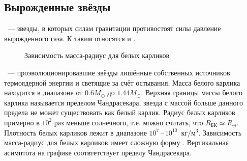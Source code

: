 \subsection{Вырожденные звёзды}
~--- звезды, в которых силам гравитации противостоят силы давление вырожденного газа. К таким относятся  и .

\begin{wrapfigure}[16]{r}{0.4\tw}
    \centering
    \vspace{-0.7pc}
    \caption{Зависимость масса-радиус для белых карликов}
    \label{pic:mass-radius-wd}
\end{wrapfigure}

~--- проэволюционировавшие звёзды лишённые собственных источников термоядерной энергии и светящие за счёт остывания. Масса белого карлика находится в диапазоне от $0.6M_{\odot}$ до $1.44 M_{\odot}$. Верхняя границы массы белого карлика называется пределом Чандрасекара, звезда с массой больше данного предела не может существовать как белый карлик. Радиус белых карликов примерно в $10^2$ раз меньше солнечного, т.е. можно считать, что $R_\text{БК} \simeq R_\oplus$. Плотность белых карликов лежит в диапазоне $10^7$\,--\,$10^{10}$~$\text{кг}/\text{м}^3$. Зависимость масса-радиус для белых карликов имеет сложную форму . Вертикальная асимптота на графике соотвтетствует пределу Чандрасекара. 

